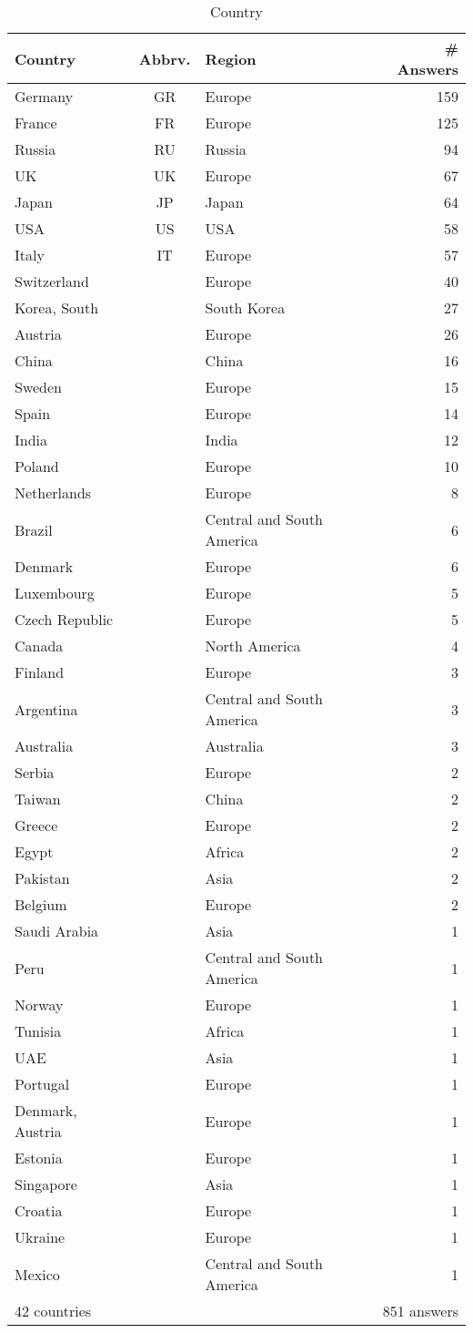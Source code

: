 \begin{table}[htb]%
\begin{center}%
\caption{Country}\label{tab:countries}%
\begin{tabular}{l|c|l|r}%
\hline%
Country & Abbrv. & Region & \# Answers \\%
\hline%
Germany&GR&Europe&159\\%
France&FR&Europe&125\\%
Russia&RU&Russia&94\\%
UK&UK&Europe&67\\%
Japan&JP&Japan&64\\%
USA&US&USA&58\\%
Italy&IT&Europe&57\\%
\hline%
Switzerland&&Europe&40\\%
Korea, South&&South Korea&27\\%
Austria&&Europe&26\\%
China&&China&16\\%
Sweden&&Europe&15\\%
Spain&&Europe&14\\%
India&&India&12\\%
Poland&&Europe&10\\%
Netherlands&&Europe&8\\%
Brazil&&Central and South America&6\\%
Denmark&&Europe&6\\%
Luxembourg&&Europe&5\\%
Czech Republic&&Europe&5\\%
Canada&&North America&4\\%
Finland&&Europe&3\\%
Argentina&&Central and South America&3\\%
Australia&&Australia&3\\%
Serbia&&Europe&2\\%
Taiwan&&China&2\\%
Greece&&Europe&2\\%
Egypt&&Africa&2\\%
Pakistan&&Asia&2\\%
Belgium&&Europe&2\\%
Saudi Arabia&&Asia&1\\%
Peru&&Central and South America&1\\%
Norway&&Europe&1\\%
Tunisia&&Africa&1\\%
UAE&&Asia&1\\%
Portugal&&Europe&1\\%
Denmark, Austria&&Europe&1\\%
Estonia&&Europe&1\\%
Singapore&&Asia&1\\%
Croatia&&Europe&1\\%
Ukraine&&Europe&1\\%
Mexico&&Central and South America&1\\%
\hline%
42 countries & & & 851 answers \\%
\hline%
\end{tabular}%
\end{center}%
\end{table}%
